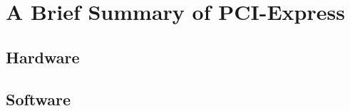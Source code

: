 
\chapter{A Brief Summary of PCI-Express}\label{chapter:introduction_pcie}

\section{Hardware}

\section{Software}